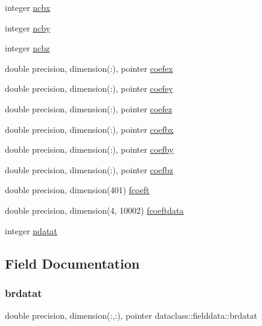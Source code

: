 \begin{DoxyCompactItemize}
\item 
integer \mbox{\hyperlink{structdataclass_1_1fielddata_a37ffb6adb65210dfd042477d255254e2}{ncbx}}
\item 
integer \mbox{\hyperlink{structdataclass_1_1fielddata_ac1e45e629c42014acf508271aedce0e0}{ncby}}
\item 
integer \mbox{\hyperlink{structdataclass_1_1fielddata_a54e28e2886fb385cf7e33132b1085d5d}{ncbz}}
\item 
double precision, dimension(\+:), pointer \mbox{\hyperlink{structdataclass_1_1fielddata_a98c251dcd14437d01d46d7266332149c}{coefex}}
\item 
double precision, dimension(\+:), pointer \mbox{\hyperlink{structdataclass_1_1fielddata_adba1751ff1e26a2ec445a4f51f4478b7}{coefey}}
\item 
double precision, dimension(\+:), pointer \mbox{\hyperlink{structdataclass_1_1fielddata_afc267a03647ee5be553ada88d6f61731}{coefez}}
\item 
double precision, dimension(\+:), pointer \mbox{\hyperlink{structdataclass_1_1fielddata_a0c95af7afe48564d7065f649721debdc}{coefbx}}
\item 
double precision, dimension(\+:), pointer \mbox{\hyperlink{structdataclass_1_1fielddata_ac26d841a700857f9b65f1147ab8bf24a}{coefby}}
\item 
double precision, dimension(\+:), pointer \mbox{\hyperlink{structdataclass_1_1fielddata_a0ac127e563d111a24880b7cc56e07491}{coefbz}}
\item 
double precision, dimension(401) \mbox{\hyperlink{structdataclass_1_1fielddata_a5225985a5539f3faa0647566e1422248}{fcoeft}}
\item 
double precision, dimension(4, 10002) \mbox{\hyperlink{structdataclass_1_1fielddata_a79c88db5f53e7b262d5235a48d82e48a}{fcoeftdata}}
\item 
integer \mbox{\hyperlink{structdataclass_1_1fielddata_adc972e43934cfad57f7572c12a8921d3}{ndatat}}
\end{DoxyCompactItemize}


\subsection{Field Documentation}
\mbox{\label{structdataclass_1_1fielddata_af2e812c6f2b2202954a724f0c7f934ca}} 
\subsubsection{\texorpdfstring{brdatat}{brdatat}}
{\footnotesize\ttfamily double precision, dimension(\+:,\+:), pointer dataclass\+::fielddata\+::brdatat}

